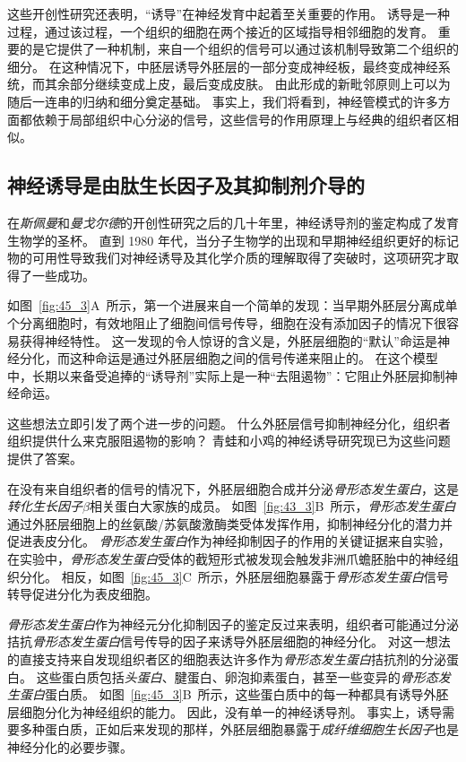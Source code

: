 这些开创性研究还表明，“诱导”在神经发育中起着至关重要的作用。
诱导是一种过程，通过该过程，一个组织的细胞在两个接近的区域指导相邻细胞的发育。
重要的是它提供了一种机制，来自一个组织的信号可以通过该机制导致第二个组织的细分。
在这种情况下，中胚层诱导外胚层的一部分变成神经板，最终变成神经系统，而其余部分继续变成上皮，最后变成皮肤。
由此形成的新毗邻原则上可以为随后一连串的归纳和细分奠定基础。
事实上，我们将看到，神经管模式的许多方面都依赖于局部组织中心分泌的信号，这些信号的作用原理上与经典的组织者区相似。



\subsection{神经诱导是由肽生长因子及其抑制剂介导的}

在\textit{斯佩曼}和\textit{曼戈尔德}的开创性研究之后的几十年里，神经诱导剂的鉴定构成了发育生物学的圣杯。
直到 1980 年代，当分子生物学的出现和早期神经组织更好的标记物的可用性导致我们对神经诱导及其化学介质的理解取得了突破时，这项研究才取得了一些成功。


如图~\ref{fig:45_3}A~所示，第一个进展来自一个简单的发现：当早期外胚层分离成单个分离细胞时，有效地阻止了细胞间信号传导，细胞在没有添加因子的情况下很容易获得神经特性。
这一发现的令人惊讶的含义是，外胚层细胞的“默认”命运是神经分化，而这种命运是通过外胚层细胞之间的信号传递来阻止的。
在这个模型中，长期以来备受追捧的“诱导剂”实际上是一种“去阻遏物”：它阻止外胚层抑制神经命运。


这些想法立即引发了两个进一步的问题。
什么外胚层信号抑制神经分化，组织者组织提供什么来克服阻遏物的影响？
青蛙和小鸡的神经诱导研究现已为这些问题提供了答案。


在没有来自组织者的信号的情况下，外胚层细胞合成并分泌\textit{骨形态发生蛋白}，这是\textit{转化生长因子$\beta$}相关蛋白大家族的成员。
如图~\ref{fig:43_3}B~所示，\textit{骨形态发生蛋白}通过外胚层细胞上的丝氨酸/苏氨酸激酶类受体发挥作用，抑制神经分化的潜力并促进表皮分化。
\textit{骨形态发生蛋白}作为神经抑制因子的作用的关键证据来自实验，在实验中，\textit{骨形态发生蛋白}受体的截短形式被发现会触发非洲爪蟾胚胎中的神经组织分化。
相反，如图~\ref{fig:45_3}C~所示，外胚层细胞暴露于\textit{骨形态发生蛋白}信号转导促进分化为表皮细胞。


\textit{骨形态发生蛋白}作为神经元分化抑制因子的鉴定反过来表明，组织者可能通过分泌拮抗\textit{骨形态发生蛋白}信号传导的因子来诱导外胚层细胞的神经分化。
对这一想法的直接支持来自发现组织者区的细胞表达许多作为\textit{骨形态发生蛋白}拮抗剂的分泌蛋白。
这些蛋白质包括\textit{头蛋白}、腱蛋白、卵泡抑素蛋白，甚至一些变异的\textit{骨形态发生蛋白}蛋白质。
如图~\ref{fig:45_3}B~所示，这些蛋白质中的每一种都具有诱导外胚层细胞分化为神经组织的能力。
因此，没有单一的神经诱导剂。
事实上，诱导需要多种蛋白质，正如后来发现的那样，外胚层细胞暴露于\textit{成纤维细胞生长因子}也是神经分化的必要步骤。


